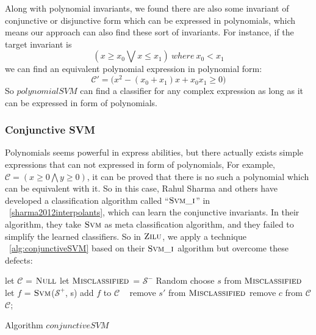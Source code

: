 Along with polynomial invariants, we found there are also some invariant of conjunctive or disjunctive form which can be expressed in polynomials,
which means our approach can also find these sort of invariants.
For instance, if the target invariant is 
$$(x \ge x_0 \bigvee x \le x_1) \ where\ x_0 < x_1$$
we can find an equivalent polynomial expression in polynomial form:
$$\mathcal{C}' = \big(x^2 - (x_0 + x_1)x + x_0x_1 \ge 0\big)$$ 
So $polynomialSVM$ can find a classifier for any complex expression as long as it can be expressed in form of polynomials.


\subsubsection{Conjunctive SVM}
Polynomials seems powerful in express abilities, 
but there actually exists simple expressions that can not expressed in form of polynomials,
For example, $\mathcal{C} = (x \ge 0 \bigwedge y \ge 0)$,
it can be proved that there is no such a polynomial which can be equivalent with it.
So in this case, Rahul Sharma and others have developed a classification algorithm called ``$\textsc{Svm\_i}$'' in ~\ref{sharma2012interpolants},
which can learn the conjunctive invariants.
In their algorithm, they take $\textsc{Svm}$ as meta classification algorithm, and they failed to simplify the learned classifiers.
So in $\textsc{Zilu}$, we apply a technique ~\ref{alg:conjunctiveSVM} based on their $\textsc{Svm\_i}$ algorithm but overcome these defects:

\begin{algorithm}[!h]
\SetAlgoVlined
\Indm
{}
\Indp
    let $\mathcal{C}$ = $\textsc{Null}$\;
    let $\textsc{Misclassified}$ = $\mathcal{S}^-$\;
     {
        Random choose $s$ from $\textsc{Misclassified}$\;
        let $f$ = $\textsc{Svm}$($\mathcal{S}^+$, s)\;
        add $f$ to $\mathcal{C}$\;
         {\
             {
                remove $s'$ from $\textsc{Misclassified}$\;
            }
        }
    }
     {
         {
            remove $c$ from $\mathcal{C}$\;
        }
    }
    \Return $\mathcal{C}$;
\caption{Algorithm $conjunctiveSVM$}
\label{alg:conjunctiveSVM}
\end{algorithm}



